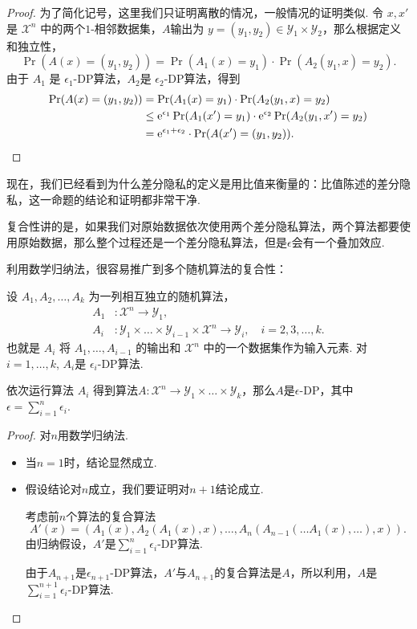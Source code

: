 \begin{proof}
为了简化记号，这里我们只证明离散的情况，一般情况的证明类似. 令 $x,x'$ 是 $\mathcal X^n$ 中的两个$1$-相邻数据集，$A$输出为 $y = (y_1, y_2) \in \mathcal Y_1 \times \mathcal Y_2$，那么根据定义和独立性，
    \[
    \Pr(A(x) = (y_1, y_2)) = \Pr(A_1(x) = y_1) \cdot \Pr(A_2(y_1, x) = y_2).
    \]
由于 $A_1$ 是 $\epsilon_1$-DP算法，$A_2$是 $\epsilon_2$-DP算法，得到
    \[
    \begin{aligned}
        \Pr(A(x) = (y_1, y_2)) &= \Pr(A_1(x) = y_1) \cdot \Pr(A_2(y_1, x) = y_2)\\
        &\leq \mathrm{e}^{\epsilon_1} \Pr(A_1(x') = y_1) \cdot \mathrm{e}^{\epsilon_2} \Pr(A_2(y_1, x') = y_2) \\
        &= \mathrm{e}^{\epsilon_1 + \epsilon_2} \cdot \Pr(A(x') = (y_1, y_2)).
    \end{aligned}
    \]
\end{proof}

现在，我们已经看到为什么差分隐私的定义是用比值来衡量的：比值陈述的差分隐私，这一命题的结论和证明都非常干净. 

复合性讲的是，如果我们对原始数据依次使用两个差分隐私算法，两个算法都要使用原始数据，那么整个过程还是一个差分隐私算法，但是$\epsilon$会有一个叠加效应. 

利用数学归纳法，很容易推广到多个随机算法的复合性：

\begin{proposition}\label{prop:composition-multi}
    设 $A_1, A_2, \dots , A_k$ 为一列相互独立的随机算法， 
    \begin{align*}
        A_1&: \mathcal X^n \to \mathcal Y_1,\\
        A_i&: \mathcal Y_1 \times \dots \times \mathcal Y_{i-1} \times \mathcal X^n \to \mathcal Y_i,\quad i = 2, 3, \dots, k.
    \end{align*}
    也就是 $A_i$ 将 $A_1, \dots, A_{i-1}$ 的输出和 $\mathcal X^n$ 中的一个数据集作为输入元素. 对$i=1,\dots,k$, $A_i$是 $\epsilon_i$-DP算法. 
        
    依次运行算法 $A_i$ 得到算法$A : \mathcal X^n \to \mathcal Y_1 \times \dots \times \mathcal Y_k$，那么$A$是$\epsilon$-DP，其中$\epsilon = \sum_{i=1}^n \epsilon_i$.
\end{proposition}
\begin{proof}
    对$n$用数学归纳法. 
    \begin{itemize}
        \item 当$n=1$时，结论显然成立.
        \item 假设结论对$n$成立，我们要证明对$n+1$结论成立.
        
        考虑前$n$个算法的复合算法
        \[A'(x) = (A_1(x), A_2(A_1(x), x), \dots, A_n(A_{n-1}(\dots A_1(x), \dots), x)).\]
        由归纳假设，$A'$是$\sum_{i=1}^n\epsilon_i$-DP算法. 
        
        由于$A_{n+1}$是$\epsilon_{n+1}$-DP算法，$A'$与$A_{n+1}$的复合算法是$A$，所以利用，$A$是$\sum_{i=1}^{n+1}\epsilon_i$-DP算法.
    \end{itemize}
\end{proof}

